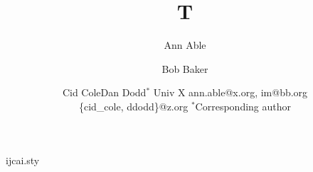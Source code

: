 \begin{filecontents*}[overwrite]{ijcai.sty}
\def\maketitle{\par\begingroup\@maketitle\endgroup
  \let\maketitle\relax \let\@maketitle\relax
  \gdef\@author{}\gdef\@title{}}
\def\@maketitle{\vbox{\centering{\LARGE\bf \@title \par}\vskip 0.2in
  {\def\and{\unskip\thinspace{\rm ,}\enspace}%
   \def\And{\unskip\enspace{\rm and}\enspace}%
   \def\affiliations{\egroup\par\bgroup\rm}%
   \def\emails{\egroup\par\bgroup\rm}%
   \bgroup\bf\@author\egroup}}}
\end{filecontents*}
\documentclass{article}
\usepackage{ijcai}
\title{T}
\author{Ann Able\and Bob Baker\and Cid Cole\And Dan Dodd$^{*}$
\affiliations Univ X
\emails ann.able@x.org, im@bb.org\\
\{cid\_cole, ddodd\}@z.org
\emails $^{*}$Corresponding author}

\maketitle

